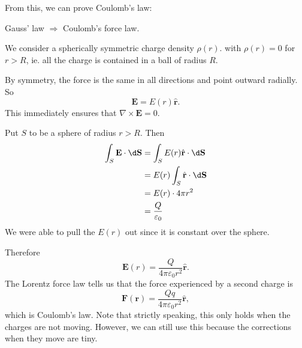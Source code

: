 \documentclass[a4paper]{article}
\begin{document}
From this, we can prove Coulomb's law:
\begin{eg}
  Gauss' law $\Rightarrow$ Coulomb's force law.

  We consider a spherically symmetric charge density $\rho (r)$. with $\rho (r) = 0$ for $r > R$, ie. all the charge is contained in a ball of radius $R$.

  \begin{center}
  \end{center}

  By symmetry, the force is the same in all directions and point outward radially. So
  \[
    \mathbf{E} = E(r) \hat{\mathbf{r}}.
  \]
  This immediately ensures that $\nabla \times \mathbf{E} = 0$.

  Put $S$ to be a sphere of radius $r > R$. Then
  \begin{align*}
    \int_S \mathbf{E}\cdot \d \mathbf{S} &= \int_S E(r) \hat{\mathbf{r}}\cdot \d \mathbf{S}\\
    &= E(r) \int_S \hat{\mathbf{r}}\cdot \d \mathbf{S}\\
    &= E(r)\cdot 4\pi r^2\\
    &= \frac{Q}{\varepsilon_0}
  \end{align*}
  We were able to pull the $E(r)$ out since it is constant over the sphere.

  Therefore
  \[
    \mathbf{E}(r) = \frac{Q}{4\pi\varepsilon_0 r^2}\hat{\mathbf{r}}.
  \]
  The Lorentz force law tells us that the force experienced by a second charge is
  \[
    \mathbf{F}(\mathbf{r}) = \frac{Qq}{4\pi\varepsilon_0 r^2}\hat{\mathbf{r}},
  \]
  which is Coulomb's law. Note that strictly speaking, this only holds when the charges are not moving. However, we can still use this because the corrections when they move are tiny.
\end{eg}
\end{document}
